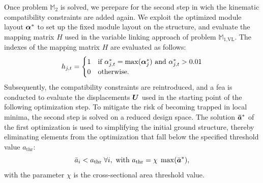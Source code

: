 Once problem $\mathbb{M}_2$ is solved, we perepare for the second step in wich the kinematic compatibility constraints are added again. We exploit the optimized module layout $\bm{\alpha}^*$ to set up the fixed module layout on the structure, and evaluate the mapping matrix $H$ used in the variable linking approach of problem ${\mathbb{M}}_\text{1,VL}$. The indexes of the mapping matrix $H$ are evaluated as follows:
\begin{equation}
    h_{j,t} =
    \begin{cases}
      1 & \text{if $\alpha^*_{j,t} = \max(\bm{\alpha}^*_{j})$ and $\alpha^*_{j,t}>0.01$} \\
      0 & \text{otherwise.} 
    \end{cases}
\end{equation}
Subsequently, the compatibility constraints are reintroduced, and a \gls{fea} is conducted to evaluate the displacements $\bm{U}$ used in the starting point of the following optimization step. To mitigate the risk of becoming trapped in local minima, the second step is solved on a reduced design space. The solution $\bm{\bar{a}}^*$ of the first optimization is used to simplifying the initial ground structure, thereby eliminating elements from the optimization that fall below the specified threshold value $a_{\text{thr}}$:
\begin{equation}
    \bar{a}_i<a_{\text{thr}} \; \forall i, \text{ with }a_{\text{thr}} = \chi \; \max(\bar{\bm{a}}^*),
    \label{eq:06_thr}
\end{equation}
with the parameter $\chi$ is the cross-sectional area threshold value.


